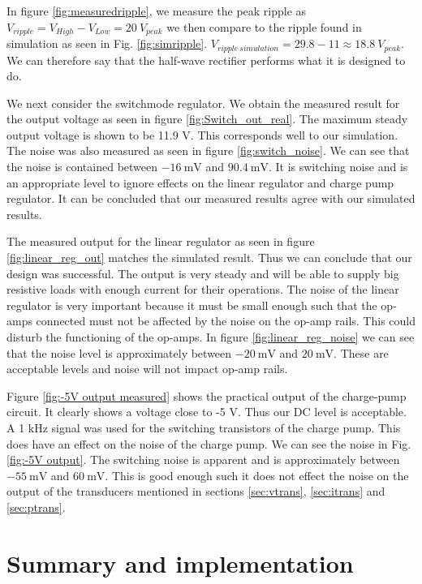 In figure \ref{fig:measuredripple}, we measure the peak ripple as $V_{ripple}=V_{High}-V_{Low}=20 \  V_{peak}$ we then compare to the ripple found in simulation as seen in Fig. \ref{fig:simripple}. $V_{ripple \ simulation}=29.8-11\approx 18.8  \ V_{peak}$. We can therefore say that the half-wave rectifier performs what it is designed to do.

We next consider the switchmode regulator. We obtain the measured result for the output voltage as seen in figure \ref{fig:Switch_out_real}. The maximum steady output voltage is shown to be 11.9 V. This corresponds well to our simulation. The noise was also measured as seen in figure \ref{fig:switch_noise}. We can see that the noise is contained between $\SI{-16}{\milli \volt}$ and $\SI{90.4}{\milli \volt}$. It is switching noise and is an appropriate level to ignore effects on the linear regulator and charge pump regulator. It can be concluded that our measured results agree with our simulated results.

The measured output for the linear regulator as seen in figure \ref{fig:linear_reg_out} matches the simulated result. Thus we can conclude that our design was successful. The output is very steady and will be able to supply big resistive loads with enough current for their operations. The noise of the linear regulator is very important because it must be small enough such that the op-amps connected  must not be affected by the noise on the op-amp rails. This could disturb the functioning of the op-amps. In figure \ref{fig:linear_reg_noise} we can see that the noise level is approximately between $\SI{-20}{\milli \volt}$ and $\SI{20}{\milli \volt}$. These are acceptable levels and noise will not impact op-amp rails. 

Figure \ref{fig:-5V output measured}  shows the practical output of the charge-pump circuit. It clearly shows a voltage close to -5 V. Thus our DC level is acceptable. A 1 kHz signal was used for the switching transistors of the charge pump. This does have an effect on the noise of the charge pump. We can see the noise in Fig. \ref{fig:-5V output}. The switching noise is apparent and is approximately between $\SI{-55}{\milli \volt}$ and $\SI{60}{\milli \volt}$. This is good enough such  it does not effect the noise on the output of the transducers mentioned in sections \ref{sec:vtrans}, \ref{sec:itrans} and \ref{sec:ptrans}.



\section{Summary and implementation}

